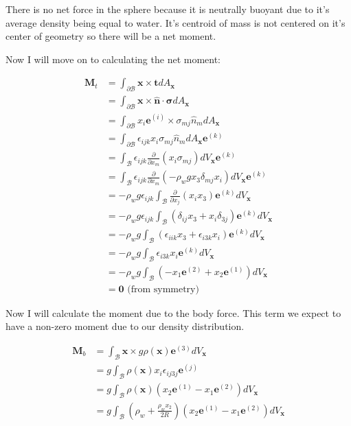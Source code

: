 There is no net force in the sphere because it is neutrally buoyant due to it's average density being equal to water. It's centroid of mass is not centered on it's center of geometry so there will be a net moment. 

Now I will move on to calculating the net moment:

\begin{align*}
    \mathbf{M}_t &= \int_{\partial\mathcal{B}}\mathbf{x}\times\mathbf{t}dA_{\mathbf{x}} \\ 
    &= \int_{\partial\mathcal{B}}\mathbf{x}\times\mathbf{\hat n} \cdot \boldsymbol{\sigma} dA_\mathbf{x} \\
    &= \int_{\partial\mathcal{B}} x_i\mathbf{e}^{(i)}\times\sigma_{mj}\hat n_mdA_\mathbf{x} \\&=\int_{\partial\mathcal{B}}\epsilon_{ijk}x_i\sigma_{mj}\hat n_m dA_\mathbf{x}\mathbf{e}^{(k)} \\
    &= \int_{\mathcal{B}} \epsilon_{ijk}\frac{\partial}{\partial x_m}(x_i \sigma_{mj}) dV_\mathbf{x}\mathbf{e}^{(k)} \\
    &= \int_{\mathcal{B}} \epsilon_{ijk}\frac{\partial}{\partial x_m}(-\rho_w g x_3 \delta_{mj} x_i) dV_\mathbf{x}\mathbf{e}^{(k)} \\
    &= -\rho_w g \epsilon_{ijk} \int_\mathcal{B}\frac{\partial}{\partial x_j}(x_i x_3)\mathbf{e}^{(k)}dV_\mathbf{x} \\
    &= -\rho_w g \epsilon_{ijk} \int_\mathcal{B}(\delta_{ij}x_3 + x_i\delta_{3j})\mathbf{e}^{(k)}dV_\mathbf{x} \\
    &= -\rho_w g \int_\mathcal{B}(\epsilon_{iik}x_3 + \epsilon_{i3k}x_i)\mathbf{e}^{(k)}dV_\mathbf{x} \\
    &= -\rho_w g \int_\mathcal{B} \epsilon_{i3k}x_i\mathbf{e}^{(k)}dV_\mathbf{x} \\
    &= -\rho_w g \int_\mathcal{B} (-x_1 \mathbf{e}^{(2)} + x_2 \mathbf{e}^{(1)}) dV_\mathbf{x} \\
    &= \mathbf{0} \text{ (from symmetry)}
\end{align*}

Now I will calculate the moment due to the body force. This term we expect to have a non-zero moment due to our density distribution. 

\begin{align*}
    \mathbf{M}_b &= \int_\mathcal{B} \mathbf{x}\times g \rho(\mathbf{x}) \mathbf{e}^{(3)} dV_\mathbf{x} \\
    &= g\int_\mathcal{B} \rho(\mathbf{x})x_i\epsilon_{ij3j}\mathbf{e}^{(j)} \\
    &= g\int_\mathcal{B} \rho(\mathbf{x})(x_2\mathbf{e}^{(1)}-x_1\mathbf{e}^{(2)})dV_\mathbf{x} \\
    &= g\int_\mathcal{B} \left(\rho_w+\frac{\rho_wx_2}{2R}\right)(x_2\mathbf{e}^{(1)}-x_1\mathbf{e}^{(2)})dV_\mathbf{x} \\
\end{align*}

